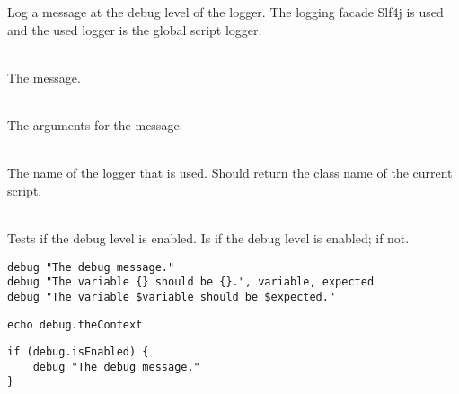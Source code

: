 %


Log a message at the debug level of the logger.
The logging facade Slf4j\cite{slf4j13} is used and the used logger is
the global script logger.

\begin{asparadesc}
%
\item[\code{message}] \hfill \\
The message.
%
\item[\code{arguments...}] \hfill \\
The arguments for the message.
%
\item[\code{theContext}] \hfill \\
The name of the logger that is used. Should return the class name of the current
script.
%
\item[\code{isEnabled}] \hfill \\
Tests if the debug level is enabled. Is  if the debug level is enabled;
 if not.
%
\end{asparadesc}

\begin{lstlisting}[style=Groovybash, label={lst:example_debug1}, title={%
Outputs a debug logging message with arguments.}]
debug "The debug message."
debug "The variable {} should be {}.", variable, expected
debug "The variable $variable should be $expected."
\end{lstlisting}

\begin{lstlisting}[style=Groovybash, label={lst:example_debug2}, title={%
Prints the name of the current logger.}]
echo debug.theContext
\end{lstlisting}

\begin{lstlisting}[style=Groovybash, label={lst:example_debug3}, title={%
Tests if the debug level is enabled.}]
if (debug.isEnabled) {
    debug "The debug message."
}
\end{lstlisting}

